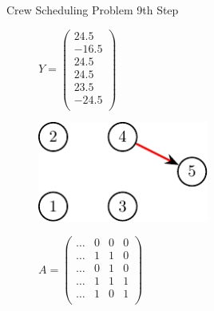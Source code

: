 \documentclass{beamer}
\begin{document}
\begin{frame}{Crew Scheduling Problem}
    9th Step
    \begin{figure}[!htb]
        \begin{minipage}{0.48\textwidth}
            \centering
            $Y = \begin{pmatrix} 24.5\\ -16.5\\ 24.5\\ 24.5\\ 23.5\\ -24.5\\ \end{pmatrix}$
                \begin{center}
                {
                \centering
                \includegraphics[width=0.5\textwidth]{graph4.pdf}
                }
                \end{center}
            \end{minipage}
        \begin{minipage}{0.48\textwidth}
            $A = \begin{pmatrix}
                \ldots & 0 & 0 & 0 \\
                \ldots & 1 & 1 & 0 \\
                \ldots & 0 & 1 & 0 \\
                \ldots & 1 & 1 & 1 \\
                \ldots & 1 & 0 & 1 \\
            \end{pmatrix}$
        \end{minipage}
    \end{figure}
\end{frame}
\end{document}
